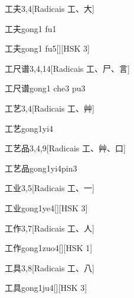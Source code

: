 \begin{entry}{工夫}{3,4}[Radicais ⼯、⼤]
  \begin{phonetics}{工夫}{gong1 fu1}
  \end{phonetics}
  \begin{phonetics}{工夫}{gong1 fu5}[][HSK 3]
  \end{phonetics}
\end{entry}

\begin{entry}{工尺谱}{3,4,14}[Radicais ⼯、⼫、⾔]
  \begin{phonetics}{工尺谱}{gong1 che3 pu3}
  \end{phonetics}
\end{entry}

\begin{entry}{工艺}{3,4}[Radicais ⼯、⾋]
  \begin{phonetics}{工艺}{gong1yi4}
  \end{phonetics}
\end{entry}

\begin{entry}{工艺品}{3,4,9}[Radicais ⼯、⾋、⼝]
  \begin{phonetics}{工艺品}{gong1yi4pin3}
  \end{phonetics}
\end{entry}

\begin{entry}{工业}{3,5}[Radicais ⼯、⼀]
  \begin{phonetics}{工业}{gong1ye4}[][HSK 3]
  \end{phonetics}
\end{entry}

\begin{entry}{工作}{3,7}[Radicais ⼯、⼈]
  \begin{phonetics}{工作}{gong1zuo4}[][HSK 1]
  \end{phonetics}
\end{entry}

\begin{entry}{工具}{3,8}[Radicais ⼯、⼋]
  \begin{phonetics}{工具}{gong1ju4}[][HSK 3]
  \end{phonetics}
\end{entry}

